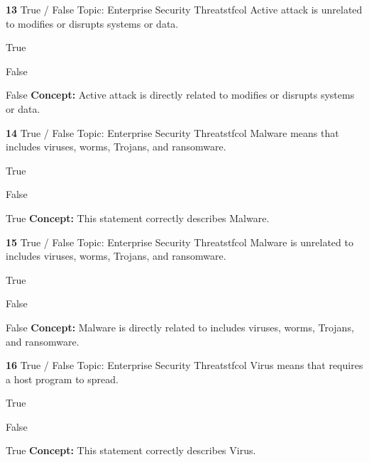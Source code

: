 \documentclass[10pt,a4paper]{article}
\begin{document}
\begin{qcard}{\color{white}\textbf{13} \hfill \small True / False \textbar{} Topic: Enterprise Security Threats}{tfcol}
Active attack is unrelated to modifies or disrupts systems or data.

\begin{qoptions}
\item True
\item False
\end{qoptions}
\begin{explainbox}{False}
\textbf{Concept:} Active attack is directly related to modifies or disrupts systems or data.
\end{explainbox}
\end{qcard}

\begin{qcard}{\color{white}\textbf{14} \hfill \small True / False \textbar{} Topic: Enterprise Security Threats}{tfcol}
Malware means that includes viruses, worms, Trojans, and ransomware.

\begin{qoptions}
\item True
\item False
\end{qoptions}
\begin{explainbox}{True}
\textbf{Concept:} This statement correctly describes Malware.
\end{explainbox}
\end{qcard}

\begin{qcard}{\color{white}\textbf{15} \hfill \small True / False \textbar{} Topic: Enterprise Security Threats}{tfcol}
Malware is unrelated to includes viruses, worms, Trojans, and ransomware.

\begin{qoptions}
\item True
\item False
\end{qoptions}
\begin{explainbox}{False}
\textbf{Concept:} Malware is directly related to includes viruses, worms, Trojans, and ransomware.
\end{explainbox}
\end{qcard}

\begin{qcard}{\color{white}\textbf{16} \hfill \small True / False \textbar{} Topic: Enterprise Security Threats}{tfcol}
Virus means that requires a host program to spread.

\begin{qoptions}
\item True
\item False
\end{qoptions}
\begin{explainbox}{True}
\textbf{Concept:} This statement correctly describes Virus.
\end{explainbox}
\end{qcard}
\end{document}
